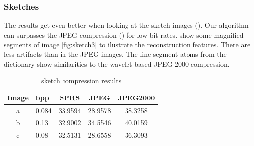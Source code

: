\clearpage
\subsubsection{Sketches}
The results get even better when looking at the sketch images
(). Our algorithm can surpasses the JPEG compression
() for low bit rates.  show
some magnified segments of image \ref{fig:sketch3} to ilustrate the
reconstruction features. There are less artifacts than in the JPEG images. The
line segment atoms from the dictionary show similarities to the wavelet based
JPEG 2000 compression.


\begin{table}[H]
\centering
\begin{tabular}{| c l | c | c | c|}
\hline\hline
Image & bpp & SPRS & JPEG & JPEG2000 \\
\hline
a & 0.084 & 33.9594 & 28.9578 & 38.3258  \\
\hline
b & 0.13 & 32.9002 & 34.5546 &  40.0159 \\
\hline
c & 0.08 & 32.5131 & 28.6558 & 36.3093  \\
\hline
\end{tabular}
\caption{sketch compression results}
\label{tab:compression2}
\end{table}

